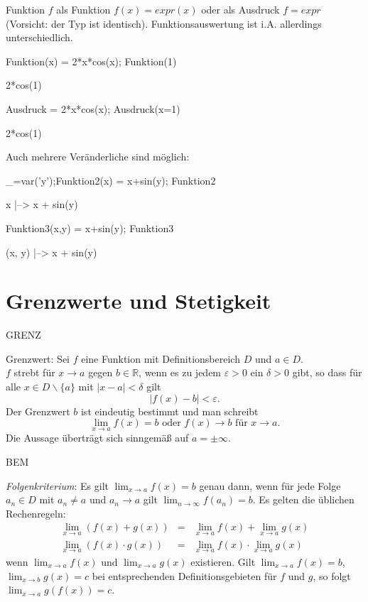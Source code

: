 \documentclass[fontsize=12pt,paper=a4,twoside,bibtotoc,idxtotoc,
liststotoc,pagesize,BCOR1.2cm,DIV15,chapterprefix,pagesize=pdftex]{scrbook}
\theoremstyle{plain}
\theoremstyle{definition}
\theoremstyle{remark}
\begin{document}
Funktion $f$ als Funktion $f(x)=expr(x)$ oder als Ausdruck $f=expr$ (Vorsicht: der Typ ist identisch).
Funktionsauswertung ist i.A. allerdings unterschiedlich.
\begin{sagein}
Funktion(x) = 2*x*cos(x); Funktion(1)
\end{sagein}
\begin{sage}
  2*cos(1)
\end{sage}
\begin{sagein}
Ausdruck = 2*x*cos(x); Ausdruck(x=1)
\end{sagein}
\begin{sage}
  2*cos(1)
\end{sage}
Auch mehrere Veränderliche  sind möglich:
\begin{sagein}
_=var('y');Funktion2(x) = x+sin(y); Funktion2
\end{sagein}
\begin{sage}
 x |--> x + sin(y)
\end{sage}
\begin{sagein}
Funktion3(x,y) = x+sin(y); Funktion3
\end{sagein}
\begin{sage}
  (x, y) |--> x + sin(y)
\end{sage}

\section{Grenzwerte und Stetigkeit}

GRENZ

{\color{red} Grenzwert}: Sei $f$ eine Funktion mit Definitionsbereich $D$ und $a\in D$.\\
$f$ strebt für $x \rightarrow a$ gegen $b \in \mathbb{R}$, wenn es zu jedem $\varepsilon >0$ ein $\delta >0$ gibt, so
dass für alle $x \in D\smallsetminus\{a \}$ mit $|x-a|<\delta$ gilt 
\[ |f(x)-b| < \varepsilon .\]
Der Grenzwert $b$ ist eindeutig bestimmt und man schreibt
\[ \lim_{x \rightarrow a} f(x) =b \mbox{ oder } f(x) \rightarrow b
\mbox{ für } x \rightarrow a. \]
Die Aussage überträgt sich sinngemäß auf $a=\pm \infty$.

BEM


 \emph{Folgenkriterium}: Es gilt $ \lim_{x \rightarrow a} f(x) =b$
genau dann, wenn für jede Folge $a_n \in D$ mit $a_n \neq a$ und $a_n \rightarrow a$
gilt $\lim_{n \rightarrow \infty} f(a_n)=b$.
 Es gelten die üblichen Rechenregeln:
\begin{eqnarray*}
\lim_{x \rightarrow a}(f(x)+g(x)) &=&\lim_{x \rightarrow a} f(x) +
\lim_{x \rightarrow a} g(x) \\
\lim_{x \rightarrow a}(f(x) \cdot g(x)) &=& \lim_{x \rightarrow a}
f(x) \cdot \lim_{x \rightarrow a} g(x)
\end{eqnarray*}
wenn $\lim_{x \rightarrow a} f(x)$ und $\lim_{x \rightarrow a}g(x)$
existieren. 
 Gilt $\lim_{x \rightarrow a} f(x)=b$, $\lim_{x \rightarrow b}
g(x)=c$ bei entsprechenden Definitionsgebieten für $f$ und $g$, so
folgt $\lim_{x \rightarrow a} g(f(x)) =c$.
\end{document}
